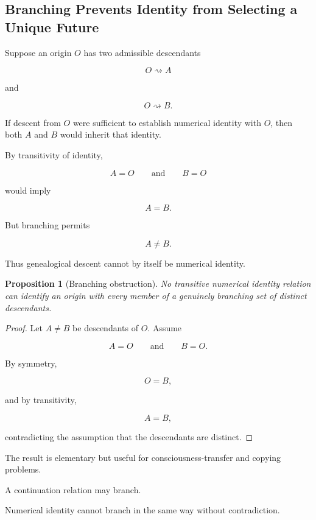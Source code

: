 \documentclass[
  11pt,
  a4paper,
  DIV=12,
  BCOR=0mm,
  parskip=half-
]{scrartcl}
\newcommand{\leadsto}{\rightsquigarrow}
\theoremstyle{definition}
\theoremstyle{plain}
\newtheorem{proposition}[definition]{Proposition}
\theoremstyle{remark}
\begin{document}
\subsection{Branching Prevents Identity from Selecting a Unique Future}
\label{app:branching-identity}

Suppose an origin \(O\) has two admissible descendants

\[
  O\leadsto A
\]

and

\[
  O\leadsto B.
\]

If descent from \(O\) were sufficient to establish numerical identity with
\(O\), then both \(A\) and \(B\) would inherit that identity.

By transitivity of identity,

\[
  A=O
  \qquad\text{and}\qquad
  B=O
\]

would imply

\[
  A=B.
\]

But branching permits

\[
  A\neq B.
\]

Thus genealogical descent cannot by itself be numerical identity.

\begin{proposition}[Branching obstruction]
\label{prop:branching-obstruction}
No transitive numerical identity relation can identify an origin with every
member of a genuinely branching set of distinct descendants.
\end{proposition}

\begin{proof}
Let \(A\neq B\) be descendants of \(O\). Assume

\[
  A=O
  \qquad\text{and}\qquad
  B=O.
\]

By symmetry,

\[
  O=B,
\]

and by transitivity,

\[
  A=B,
\]

contradicting the assumption that the descendants are distinct.
\end{proof}

The result is elementary but useful for consciousness-transfer and copying
problems.

A continuation relation may branch.

Numerical identity cannot branch in the same way without contradiction.

\end{document}
